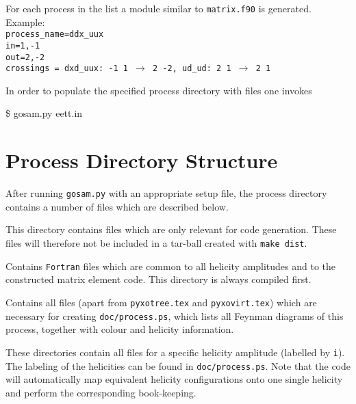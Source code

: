 \documentclass[11pt,a4paper]{refrep}
\begin{document}
\begin{enumerate}
    For each process in the list a module similar to {\tt matrix.f90} is  generated.  \\
    Example: \\                                                 
    {\tt process\_name=ddx\_uux }\\                                           
    {\tt in=1,-1 }\\                                                          
    {\tt out=2,-2  }\\                                                       
    {\tt crossings = dxd\_uux: -1 1 $\to$ 2 -2, ud\_ud: 2 1 $\to$ 2 1  }    
\end{enumerate}



In order to populate the specified process directory with files
one invokes
\begin{example}
\$ gosam.py eett.in
\end{example}

\section{Process Directory Structure}



After running \texttt{gosam.py} with an appropriate setup file, the
process directory contains a number of files which are described below.

 This directory contains files which are only
relevant for code ge\-ne\-ration. These files will therefore not be included
in a tar-ball created with \texttt{make dist}.

 Contains {\tt Fortran} files which are common to all helicity
amplitudes and to the constructed matrix element code. This directory
is always compiled first.

 Contains all files (apart from
\texttt{pyxotree.tex} and \texttt{pyxovirt.tex}) which are
necessary for creating
\texttt{doc/process.ps}, which lists all Feynman diagrams of this process, 
together with colour and helicity information.

 These directories contain all files for a specific
helicity amplitude (labelled by {\tt i}). The labeling of the helicities can be found in
\texttt{doc/process.ps}. 
Note that the code will automatically map equivalent helicity 
configurations onto one single helicity and perform the corresponding book-keeping.
\end{document}
